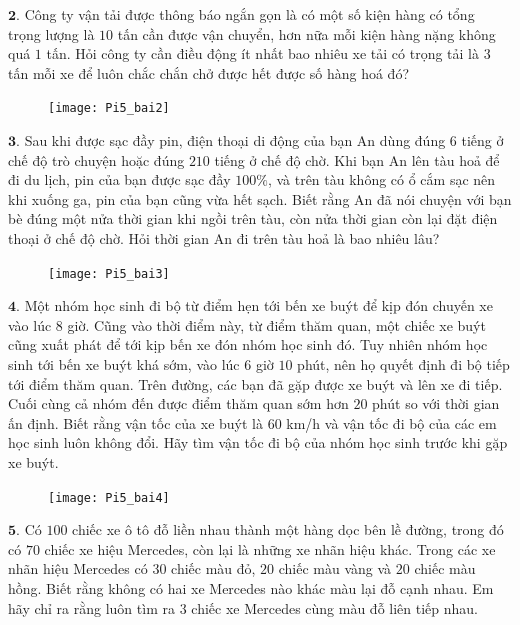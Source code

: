 \begin{multicols}{2}
	$\pmb{2.}$ Công ty vận tải được thông báo ngắn gọn là có một số kiện hàng có tổng trọng lượng là $10$ tấn cần được vận chuyển, hơn nữa mỗi kiện hàng nặng không quá $1$ tấn. Hỏi công ty  cần điều động ít nhất bao nhiêu xe tải có trọng tải là $3$ tấn mỗi xe để luôn chắc chắn chở được hết được số hàng hoá đó?
	\begin{figure}[H]
			\centering
			\captionsetup{labelformat= empty, justification=centering}
			\texttt{[image: Pi5\_bai2]}
			\vspace*{-15pt}
		\end{figure}
	$\pmb{3.}$ Sau khi được sạc đầy pin, điện thoại di động của bạn An dùng đúng $6$ tiếng ở chế độ trò chuyện hoặc đúng $210$ tiếng ở chế độ chờ. Khi bạn An lên tàu hoả để đi du lịch, pin của bạn được sạc đầy $100\%$, và trên tàu không có ổ cắm sạc nên khi xuống ga, pin của bạn cũng vừa hết sạch. Biết rằng An đã nói chuyện với bạn bè đúng một nửa thời gian khi ngồi trên tàu, còn nửa thời gian còn lại đặt điện thoại ở chế độ chờ. Hỏi thời gian An đi trên tàu hoả là bao nhiêu lâu?
	\begin{figure}[H]
			\centering
			\vspace*{-5pt}
			\captionsetup{labelformat= empty, justification=centering}
			\texttt{[image: Pi5\_bai3]}
			\vspace*{-15pt}
		\end{figure}
	$\pmb{4.}$ Một nhóm học sinh đi bộ từ điểm hẹn tới bến xe buýt để kịp đón chuyến xe vào lúc $8$ giờ. Cũng vào thời điểm này, từ điểm thăm quan, một chiếc xe buýt cũng xuất phát để tới kịp bến xe đón nhóm học sinh đó. Tuy  nhiên nhóm học sinh tới bến xe buýt khá sớm, vào lúc $6$ giờ $10$ phút, nên họ quyết định đi bộ tiếp tới điểm thăm quan. Trên đường, các bạn đã gặp được xe buýt và lên xe đi tiếp.  Cuối cùng cả nhóm đến được điểm thăm quan sớm hơn $20$ phút so với thời gian ấn định. Biết rằng vận tốc của xe buýt là $60$ km/h và vận tốc đi bộ của các em học sinh luôn không đổi. Hãy tìm vận tốc đi bộ của nhóm học sinh trước khi gặp xe buýt.
	\begin{figure}[H]
			\centering
			\captionsetup{labelformat= empty, justification=centering}
			\texttt{[image: Pi5\_bai4]}
			\vspace*{-10pt}
		\end{figure}
	$\pmb{5.}$ 	Có $100$ chiếc xe ô tô đỗ liền nhau thành một hàng dọc bên lề đường, trong đó có $70$ chiếc xe hiệu Mercedes, còn lại là những xe nhãn hiệu khác. Trong các xe nhãn hiệu Mercedes có $30$ chiếc màu đỏ, $20$ chiếc màu vàng và $20$ chiếc màu hồng. Biết rằng không có hai xe Mercedes nào khác màu lại đỗ cạnh nhau. Em hãy chỉ ra rằng luôn tìm ra $3$ chiếc xe Mercedes cùng màu đỗ liên tiếp nhau.

\end{multicols}
